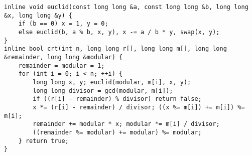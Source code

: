 \begin{lstlisting}
inline void euclid(const long long &a, const long long &b, long long &x, long long &y) {
	if (b == 0) x = 1, y = 0;
	else euclid(b, a % b, x, y), x -= a / b * y, swap(x, y);
}
inline bool crt(int n, long long r[], long long m[], long long &remainder, long long &modular) {
	remainder = modular = 1;
	for (int i = 0; i < n; ++i) {
		long long x, y; euclid(modular, m[i], x, y);
		long long divisor = gcd(modular, m[i]);
		if ((r[i] - remainder) % divisor) return false;
		x *= (r[i] - remainder) / divisor; ((x %= m[i]) += m[i]) %= m[i];
		remainder += modular * x; modular *= m[i] / divisor;
		((remainder %= modular) += modular) %= modular;
	} return true;
}
\end{lstlisting}
